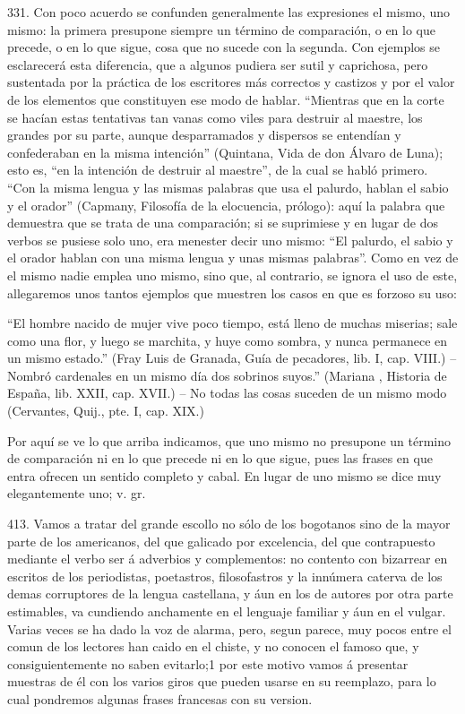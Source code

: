 ﻿\documentclass{book}
\begin{document}
331. Con poco acuerdo se confunden generalmente las expresiones el mismo, uno mismo: la primera presupone siempre un término de comparación, o en lo que precede, o en lo que sigue, cosa que no sucede con la segunda. Con ejemplos se esclarecerá esta diferencia, que a algunos pudiera ser sutil y caprichosa, pero sustentada por la práctica de los escritores más correctos y castizos y por el valor de los elementos que constituyen ese modo de hablar.
“Mientras que en la corte se hacían estas tentativas tan vanas como viles para destruir al maestre, los grandes por su parte, aunque desparramados y dispersos se entendían y confederaban en la misma intención” (Quintana, Vida de don Álvaro de Luna); esto es, “en la intención de destruir al maestre”, de la cual se habló primero.
“Con la misma lengua y las mismas palabras que usa el palurdo, hablan el sabio y el orador” (Capmany, Filosofía de la elocuencia, prólogo): aquí la palabra que demuestra que se trata de una comparación; si se suprimiese y en lugar de dos verbos se pusiese solo uno, era menester decir uno mismo: “El palurdo, el sabio y el orador hablan con una misma lengua y unas mismas palabras”.
Como en vez de el mismo nadie emplea uno mismo, sino que, al contrario, se ignora el uso de este, allegaremos unos tantos ejemplos que muestren los casos en que es forzoso su uso:

“El hombre nacido de mujer vive poco tiempo, está lleno de muchas miserias; sale como una flor, y luego se marchita, y huye como sombra, y nunca permanece en un mismo estado.” (Fray Luis de Granada, Guía de pecadores, lib. I, cap. VIII.) – Nombró cardenales en un mismo día dos sobrinos suyos.” (Mariana , Historia de España, lib. XXII, cap. XVII.) – No todas las cosas suceden de un mismo modo (Cervantes, Quij., pte. I, cap. XIX.)

Por aquí se ve lo que arriba indicamos, que uno mismo no presupone un término de comparación ni en lo que precede ni en lo que sigue, pues las frases en que entra ofrecen un sentido completo y cabal.
En lugar de uno mismo se dice muy elegantemente uno; v. gr.

413. Vamos a tratar del grande escollo no sólo de los bogotanos sino de la mayor parte de los americanos, del que galicado por excelencia, del que contrapuesto mediante el verbo ser á adverbios y complementos: no contento con bizarrear en escritos de los periodistas, poetastros, filosofastros y la innúmera caterva de los demas corruptores de la lengua castellana, y áun en los de autores por otra parte estimables, va cundiendo anchamente en el lenguaje familiar y áun en el vulgar. Varias veces se ha dado la voz de alarma, pero, segun parece, muy pocos entre el comun de los lectores han caido en el chiste, y no conocen el famoso que, y consiguientemente no saben evitarlo;1 por este motivo vamos á presentar muestras de él con los varios giros que pueden usarse en su reemplazo, para lo cual pondremos algunas frases francesas con su version.
\end{document}
